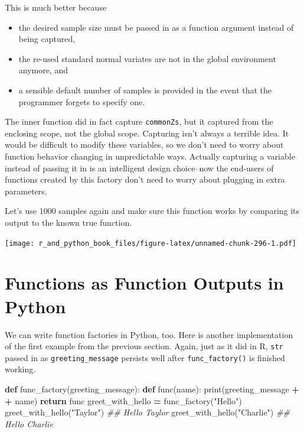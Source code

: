 \documentclass[
  12pt,
  krantz2]{krantz}
\makeatletter
\newenvironment{Shaded}{\begin{snugshade}}{\end{snugshade}}
\newcommand{\BuiltInTok}[1]{#1}
\newcommand{\CommentTok}[1]{\textcolor[rgb]{0.37,0.37,0.37}{\textit{#1}}}
\newcommand{\ControlFlowTok}[1]{\textcolor[rgb]{0.27,0.27,0.27}{\textbf{#1}}}
\newcommand{\KeywordTok}[1]{\textcolor[rgb]{0.27,0.27,0.27}{\textbf{#1}}}
\newcommand{\NormalTok}[1]{#1}
\newcommand{\OperatorTok}[1]{\textcolor[rgb]{0.43,0.43,0.43}{\textbf{#1}}}
\newcommand{\StringTok}[1]{\textcolor[rgb]{0.5,0.5,0.5}{#1}}
\providecommand{\tightlist}{%
  \setlength{\itemsep}{0pt}\setlength{\parskip}{0pt}}
\newenvironment{kframe}{%
\medskip{}
\setlength{\fboxsep}{.8em}
 \def\at@end@of@kframe{}%
 \ifinner\ifhmode%
  \def\at@end@of@kframe{\end{minipage}}%
  \begin{minipage}{\columnwidth}%
 \fi\fi%
 \def\FrameCommand##1{\hskip\@totalleftmargin \hskip-\fboxsep
 \colorbox{shadecolor}{##1}\hskip-\fboxsep
     \hskip-\linewidth \hskip-\@totalleftmargin \hskip\columnwidth}%
 \MakeFramed {\advance\hsize-\width
   \@totalleftmargin\z@ \linewidth\hsize
   \@setminipage}}%
 {\par\unskip\endMakeFramed%
 \at@end@of@kframe}
\renewenvironment{Shaded}{\begin{kframe}}{\end{kframe}}
\makeatother
\begin{document}
This is much better because

\begin{itemize}
\tightlist
\item
  the desired sample size must be passed in as a function argument instead of being captured,
\item
  the re-used standard normal variates are not in the global environment anymore, and
\item
  a sensible default number of samples is provided in the event that the programmer forgets to specify one.
\end{itemize}

The inner function did in fact capture \texttt{commonZs}, but it captured from the enclosing scope, not the global scope. Capturing isn't always a terrible idea. It would be difficult to modify these variables, so we don't need to worry about function behavior changing in unpredictable ways. Actually capturing a variable instead of passing it in is an intelligent design choice--now the end-users of functions created by this factory don't need to worry about plugging in extra parameters.

Let's use \(1000\) samples again and make sure this function works by comparing its output to the known true function.

\texttt{[image: r\_and\_python\_book\_files/figure-latex/unnamed-chunk-296-1.pdf]}

\hypertarget{functions-as-function-outputs-in-python}{%
\section{Functions as Function Outputs in Python}\label{functions-as-function-outputs-in-python}}

We can write function factories in Python, too. Here is another implementation of the first example from the previous section. Again, just as it did in R, \texttt{str} passed in as \texttt{greeting\_message} persists well after \texttt{func\_factory()} is finished working.

\begin{Shaded}
\begin{Highlighting}[]
\KeywordTok{def}\NormalTok{ func\_factory(greeting\_message):}
  \KeywordTok{def}\NormalTok{ func(name):}
    \BuiltInTok{print}\NormalTok{(greeting\_message }\OperatorTok{+} \StringTok{\textquotesingle{} \textquotesingle{}} \OperatorTok{+}\NormalTok{ name)}
  \ControlFlowTok{return}\NormalTok{ func}
\NormalTok{greet\_with\_hello }\OperatorTok{=}\NormalTok{ func\_factory(}\StringTok{"Hello"}\NormalTok{)}
\NormalTok{greet\_with\_hello(}\StringTok{"Taylor"}\NormalTok{)}
\CommentTok{\#\# Hello Taylor}
\NormalTok{greet\_with\_hello(}\StringTok{"Charlie"}\NormalTok{)}
\CommentTok{\#\# Hello Charlie}
\end{Highlighting}
\end{Shaded}
\end{document}
